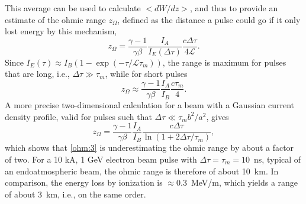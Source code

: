\documentclass [12pt,a4paper,     ]{report} %
\begin{document}
  This average can be used to calculate $<dW/dz>$, and thus to provide an estimate of the ohmic range $z_{\Omega}$, defined as the distance a pulse could go if it only lost energy by this mechanism,
%
\begin{equation}\label{ohm:2} %
                z_{\Omega} = \frac{\gamma-1}{\gamma\beta}
                             \frac{I_A}{I_E(\Delta\tau)}
                             \frac{c\Delta\tau}{4\mathcal{L}}.
\end{equation}
%
Since $I_E(\tau) \approx I_B(1-\exp(-\tau/\mathcal{L}\tau_m))$, the range is maximum for pulses that are long, i.e., $\Delta\tau \gg \tau_m$, while for short pulses
%
\begin{equation}\label{ohm:3} %
          z_{\Omega} \approx \frac{\gamma-1}{\gamma\beta}
                             \frac{I_A}{I_B}
                             \frac{c\tau_m}{4}.
\end{equation}
%
A more precise two-dimensional calculation for a beam with a Gaussian current density profile, valid for pulses such that $\Delta\tau \ll \tau_m b^2/a^2$, gives \cite{LEE--1973D}
%
\begin{equation}\label{ohm:4} %
                z_{\Omega} = \frac{\gamma-1}{\gamma\beta}
                             \frac{I_A}{I_B}
                             \frac{c\Delta\tau}{\ln(1+2\Delta\tau/\tau_m)},
\end{equation}
%
which shows that \eqref{ohm:3} is underestimating the ohmic range by about a factor of two.    For a 10 kA, 1 GeV electron beam pulse with $\Delta\tau = \tau_m = 10$~ns, typical of an endoatmospheric beam, the ohmic range is therefore of about 10~km.  In comparison, the energy loss by ionization is $\approx 0.3$~MeV/m, which yields a range of about 3~km, i.e., on the same order.
\end{document}
